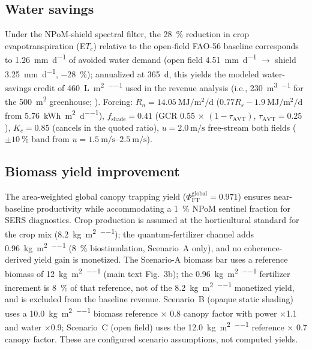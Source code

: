 \documentclass[11pt,a4paper]{article}
\begin{document}
\subsection{Water savings}

Under the NPoM-shield spectral filter, the \qty{28}{\percent} reduction in crop evapotranspiration (E$T_c$) relative to the open-field FAO-56 baseline corresponds to \qty{1.26}{\mm\per\day} of avoided water demand (open field \qty{4.51}{\mm\per\day} $\to$ shield \qty{3.25}{\mm\per\day}, \qty{-28}{\percent}); annualized at \qty{365}{\day}, this yields the modeled water-savings credit of \qty{460}{\L\per\m\squared\per\yr} used in the revenue analysis (i.e., \qty{230}{\m\cubed\per\yr} for the \qty{500}{\m\squared} greenhouse; ). Forcing: $R_n=\qty{14.05}{\mega\joule\per\m\squared\per\day}$ ($0.77R_s-\qty{1.9}{\mega\joule\per\m\squared\per\day}$ from \qty{5.76}{\kWh\per\m\squared\per\day}), $f_{\mathrm{shade}}=\num{0.41}$ (GCR \num{0.55} $\times$ $(1-\tau_{\mathrm{AVT}})$, $\tau_{\mathrm{AVT}}=\num{0.25}$), $K_c=\num{0.85}$ (cancels in the quoted ratio), $u=\qty{2.0}{\m\per\s}$ free-stream both fields ($\pm\qty{10}{\percent}$ band from $u=\qtyrange{1.5}{2.5}{\m\per\s}$).

\subsection{Biomass yield improvement}

The area-weighted global canopy trapping yield ($\Phi_{\mathrm{FT}}^{\mathrm{global}} = 0.971$) ensures near-baseline productivity while accommodating a \qty{1}{\percent} NPoM sentinel fraction for SERS diagnostics. Crop production is assumed at the horticultural standard for the crop mix (\qty{8.2}{\kg\per\m\squared\per\yr}); the quantum-fertilizer channel adds \qty{0.96}{\kg\per\m\squared\per\yr} (\qty{8}{\percent} biostimulation, Scenario~A only), and no coherence-derived yield gain is monetized. The Scenario-A biomass bar uses a reference biomass of \qty{12}{\kg\per\m\squared\per\yr} (main text Fig.~3b); the \qty{0.96}{\kg\per\m\squared\per\yr} fertilizer increment is \qty{8}{\percent} of that reference, not of the \qty{8.2}{\kg\per\m\squared\per\yr} monetized yield, and is excluded from the baseline revenue. Scenario~B (opaque static shading) uses a \qty{10.0}{\kg\per\m\squared\per\yr} biomass reference $\times$ \num{0.8} canopy factor with power $\times$\num{1.1} and water $\times$\num{0.9}; Scenario~C (open field) uses the \qty{12.0}{\kg\per\m\squared\per\yr} reference $\times$ \num{0.7} canopy factor. These are configured scenario assumptions, not computed yields.
\end{document}
